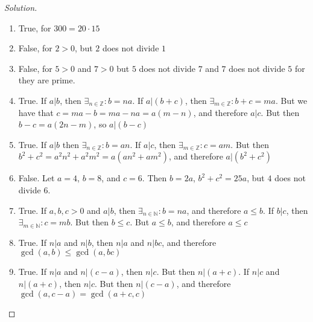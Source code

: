         \begin{proof}[Solution]
            \
            \begin{enumerate}
                \item True, for $300=20\cdot 15$
                \item False, for $2>0$, but $2$ does not divide
                    $1$
                \item False, for $5>0$ and $7>0$ but $5$ does
                    not divide $7$ and $7$ does not
                    divide $5$ for they are prime.
                \item True. If ${a}\vert{b}$, then
                    $\exists_{n\in\mathbb{Z}}:b=na$. If
                    ${a}\vert{(b+c)}$, then
                    $\exists_{m\in\mathbb{Z}}:b+c=ma$. But we
                    have that $c=ma-b=ma-na=a(m-n)$,
                    and therefore ${a}\vert{c}$. But then
                    $b-c=a(2n-m)$, so ${a}\vert{(b-c)}$
                \item True. If ${a}\vert{b}$ then
                    $\exists_{n\in\mathbb{Z}}:b=an$.
                    If ${a}\vert{c}$, then
                    $\exists_{m\in\mathbb{Z}}:c=am$. But then
                    $b^{2}+c^{2}=a^{2}n^{2}+a^{2}m^{2}%
                     =a(an^{2}+am^{2})$, and therefore
                    ${a}\vert{(b^{2}+c^{2})}$
                \item False. Let $a=4$, $b=8$, and $c=6$.
                    Then $b=2a$, $b^{2}+c^{2}=25a$, but $4$
                    does not divide $6$.
                \item True. If $a,b,c>0$ and ${a}\vert{b}$,
                    then $\exists_{n\in\mathbb{N}}:b=na$,
                    and therefore $a\leq b$. If
                    ${b}\vert{c}$, then
                    $\exists_{m\in\mathbb{N}}:c=mb$. But then
                    $b\leq c$. But $a\leq b$, and therefore
                    $a\leq c$
                \item True. If ${n}\vert{a}$ and ${n}\vert{b}$,
                    then ${n}\vert{a}$ and ${n}\vert{bc}$, and
                    therefore $\gcd(a,b)\leq\gcd(a,bc)$
                \item True. If ${n}\vert{a}$ and
                    ${n}\vert{(c-a)}$, then ${n}\vert{c}$. But
                    then ${n}\vert{(a+c)}$. If ${n}\vert{c}$
                    and ${n}\vert{(a+c)}$, then ${n}\vert{c}$.
                    But then ${n}\vert{(c-a)}$, and therefore
                    $\gcd(a,c-a)=\gcd(a+c,c)$

\end{enumerate}
\end{proof}
